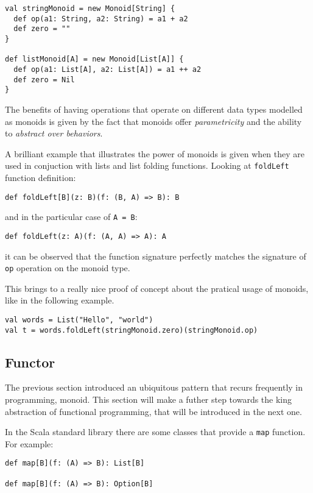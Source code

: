 \begin{verbatim}
val stringMonoid = new Monoid[String] {
  def op(a1: String, a2: String) = a1 + a2
  def zero = ""
}

def listMonoid[A] = new Monoid[List[A]] {
  def op(a1: List[A], a2: List[A]) = a1 ++ a2
  def zero = Nil
}
\end{verbatim}

The benefits of having operations that operate on different data types
modelled as monoids is given by the fact that monoids offer
\emph{parametricity} and the ability to \emph{abstract over behaviors}.

A brilliant example that illustrates the power of monoids is given when
they are used in conjuction with lists and list folding functions.
Looking at \texttt{foldLeft} function definition:

\begin{verbatim}
def foldLeft[B](z: B)(f: (B, A) => B): B
\end{verbatim}

and in the particular case of \texttt{A\ =\ B}:

\begin{verbatim}
def foldLeft(z: A)(f: (A, A) => A): A
\end{verbatim}

it can be observed that the function signature perfectly matches the
signature of \texttt{op} operation on the monoid type.

This brings to a really nice proof of concept about the pratical usage
of monoids, like in the following example.

\begin{verbatim}
val words = List("Hello", "world")
val t = words.foldLeft(stringMonoid.zero)(stringMonoid.op)
\end{verbatim}

\subsection{Functor}\label{functor}

The previous section introduced an ubiquitous pattern that recurs
frequently in programming, monoid. This section will make a futher step
towards the king abstraction of functional programming, that will be
introduced in the next one.

In the Scala standard library there are some classes that provide a
\texttt{map} function. For example:

\begin{verbatim}
def map[B](f: (A) => B): List[B]

def map[B](f: (A) => B): Option[B]
\end{verbatim}

